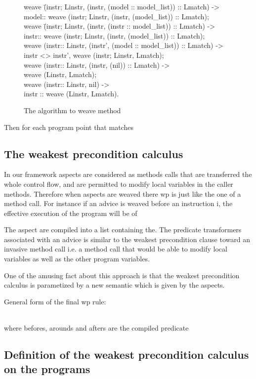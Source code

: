 \documentclass[draft]{llncs}
\begin{document}
%
\begin{figure}
\bcode
weave \=(instr; Linstr, (instr, (model :: model\_list)) :: Lmatch) -> \\
\>model:: weave (instr; Linstr, (instr, (model\_list)) :: Lmatch);\\
weave \=(instr; Linstr, (instr, (instr :: model\_list)) :: Lmatch) -> \\
\>instr:: weave (instr; Linstr, (instr, (model\_list)) :: Lmatch);\\
weave (instr:: Linstr, (instr', (model :: model\_list)) :: Lmatch) -> \\
\>instr <> instr',  weave (instr; Linstr, Lmatch);\\
weave (instr:: Linstr, (instr, (nil)) :: Lmatch) -> \\
\>weave (Linstr, Lmatch);\\
weave (instr:: Linstr, nil) -> \\
\>instr :: weave (Linstr, Lmatch).
\ecode
\caption{The algorithm to weave method}
\label{weaving_algo}
\end{figure}
Then for each program point that matches

\subsection{The weakest precondition calculus}

In our framework aspects are considered as methods calls that are transferred the whole
control flow, and are permitted to modify local variables in the caller methods. Therefore when aspects are weaved
there wp is just like the one of a method call.
For instance if an advice is weaved before an instruction i, the effective execution of the program
will be of

The aspect are compiled into a list containing the.
The predicate transformers associated with an advice is similar to the weakest precondition
clause toward an invasive method call i.e. a method call that would be able to modify local variables
as well as the other program variables.

One of the amusing fact about this approach is that the weakest precondition calculus is parametized by a new 
semantic which is given by the aspects.

General form of the final wp rule:
\bcode

\\
\ecode
where befores, arounds and afters are the compiled predicate
\subsection{Definition of the weakest precondition calculus on the programs}
\end{document}
